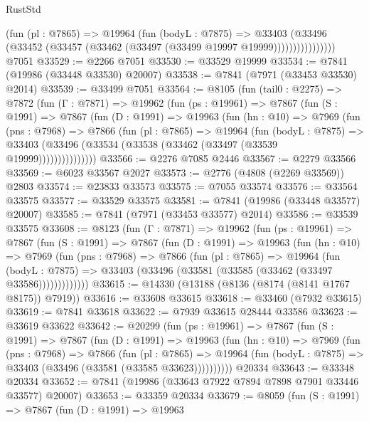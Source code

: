 \begin{lexlean}{RustStd}
\begin{coremodule}
{\begin{coremodule}
{{{{{{{{{{{{{{{{{{{{{{{{{{{{{{{{{{{{{{{{{{{{{{{{{{{{{{                    (fun (pl : @7865) =>
                    @19964
                      (fun (bodyL : @7875) =>
                      @33403
                        (@33496
                          (@33452 (@33457 (@33462 (@33497 (@33499 @19997 @19999))))))))))))))))
    @7051
@33529 := @2266 @7051
@33530 := @33529 @19999
@33534 := @7841 (@19986 (@33448 @33530) @20007)
@33538 := @7841 (@7971 (@33453 @33530) @2014)
@33539 := @33499 @7051
@33564 := @8105
    (fun (tail0 : @2275) =>
    @7872
      (fun (Γ : @7871) =>
      @19962
        (fun (ps : @19961) =>
        @7867
          (fun (S : @1991) =>
          @7867
            (fun (D : @1991) =>
            @19963
              (fun (hn : @10) =>
              @7969
                (fun (pns : @7968) =>
                @7866
                  (fun (pl : @7865) =>
                  @19964
                    (fun (bodyL : @7875) =>
                    @33403 (@33496 (@33534 (@33538 (@33462 (@33497 (@33539 @19999)))))))))))))))
@33566 := @2276 @7085 @2446
@33567 := @2279 @33566
@33569 := @6023 @33567 @2027
@33573 := @2776 (@4808 (@2269 @33569)) @2803
@33574 := @23833 @33573
@33575 := @7055 @33574
@33576 := @33564 @33575
@33577 := @33529 @33575
@33581 := @7841 (@19986 (@33448 @33577) @20007)
@33585 := @7841 (@7971 (@33453 @33577) @2014)
@33586 := @33539 @33575
@33608 := @8123
    (fun (Γ : @7871) =>
    @19962
      (fun (ps : @19961) =>
      @7867
        (fun (S : @1991) =>
        @7867
          (fun (D : @1991) =>
          @19963
            (fun (hn : @10) =>
            @7969
              (fun (pns : @7968) =>
              @7866
                (fun (pl : @7865) =>
                @19964
                  (fun (bodyL : @7875) =>
                  @33403 (@33496 (@33581 (@33585 (@33462 (@33497 @33586)))))))))))))
@33615 := @14330 (@13188 (@8136 (@8174 (@8141 @1767 @8175)) @7919))
@33616 := @33608 @33615
@33618 := @33460 (@7932 @33615)
@33619 := @7841 @33618
@33622 := @7939 @33615 @28444 @33586
@33623 := @33619 @33622
@33642 := @20299
    (fun (ps : @19961) =>
    @7867
      (fun (S : @1991) =>
      @7867
        (fun (D : @1991) =>
        @19963
          (fun (hn : @10) =>
          @7969
            (fun (pns : @7968) =>
            @7866
              (fun (pl : @7865) =>
              @19964 (fun (bodyL : @7875) => @33403 (@33496 (@33581 (@33585 @33623))))))))))
    @20334
@33643 := @33348 @20334
@33652 := @7841 (@19986 (@33643 @7922 @7894 @7898 @7901 @33446 @33577) @20007)
@33653 := @33359 @20334
@33679 := @8059
    (fun (S : @1991) =>
    @7867
      (fun (D : @1991) =>
      @19963
}}}}}}}}}}}}}}}}}}}}}}}}}}}}}}}}}}}}}}}}}}}}}}}}}}}}}}
\end{coremodule}}
\end{coremodule}
\end{lexlean}

